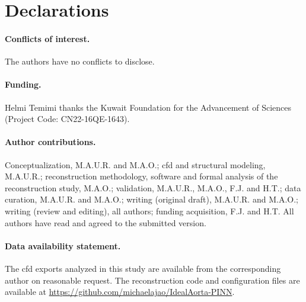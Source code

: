 \documentclass[12pt,a4paper]{article}
\newcommand{\CFD}{\ac{cfd}\xspace}
\theoremstyle{definition}
\numberwithin{equation}{section}
\newif\ifanonymized
\begin{document}
\section*{Declarations}
\paragraph{Conflicts of interest.} The authors have no conflicts to disclose.

\ifanonymized
\paragraph{Funding and author contributions.} Removed for anonymized review.
\else
\paragraph{Funding.} Helmi Temimi thanks the Kuwait Foundation for the Advancement of Sciences (Project Code: CN22-16QE-1643).

\paragraph{Author contributions.} Conceptualization, M.A.U.R. and M.A.O.; \CFD and structural modeling, M.A.U.R.; reconstruction methodology, software and formal analysis of the reconstruction study, M.A.O.; validation, M.A.U.R., M.A.O., F.J. and H.T.; data curation, M.A.U.R. and M.A.O.; writing (original draft), M.A.U.R. and M.A.O.; writing (review and editing), all authors; funding acquisition, F.J. and H.T. All authors have read and agreed to the submitted version.
\fi



\paragraph{Data availability statement.} The \CFD exports analyzed in this study are available from the corresponding author on reasonable request. \ifanonymized The reconstruction code and configuration files are available in a public repository whose link is withheld for anonymized review.\else The reconstruction code and configuration files are available at \url{https://github.com/michaelajao/IdealAorta-PINN}.\fi
\end{document}
